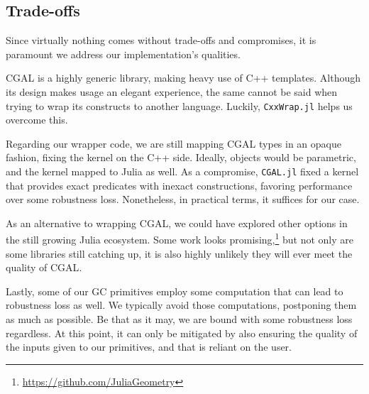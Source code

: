 \subsection{Trade-offs}%
\label{sec:solution.tradeoffs}

Since virtually nothing comes without trade-offs and compromises, it is
paramount we address our implementation's qualities.

\Ac{CGAL} is a highly generic library, making heavy use of C++ templates.
Although its design makes usage an elegant experience, the same cannot be said
when trying to wrap its constructs to another language. Luckily,
\texttt{CxxWrap.jl} helps us overcome this.

Regarding our wrapper code, we are still mapping \ac{CGAL} types in an opaque
fashion, fixing the kernel on the C++ side.  Ideally, objects would be
parametric, and the kernel mapped to Julia as well.  As a compromise,
\texttt{CGAL.jl} fixed a kernel that provides exact predicates with inexact
constructions, favoring performance over some robustness loss.  Nonetheless, in
practical terms, it suffices for our case.

As an alternative to wrapping \ac{CGAL}, we could have explored other options in
the still growing Julia ecosystem.  Some work looks
promising,\footnote{\url{https://github.com/JuliaGeometry}} but not only are
some libraries still catching up, it is also highly unlikely they will ever meet
the quality of \ac{CGAL}.

Lastly, some of our \ac{GC} primitives employ some computation that can lead to
robustness loss as well.  We typically avoid those computations, postponing them
as much as possible.  Be that as it may, we are bound with some robustness loss
regardless.  At this point, it can only be mitigated by also ensuring the
quality of the inputs given to our primitives, and that is reliant on the user.
